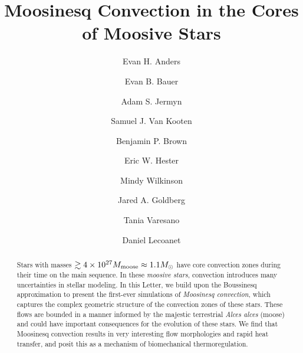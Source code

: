 \documentclass[onecolumn, twocolappendix]{aastex631}
\begin{document}
\title{Moosinesq Convection in the Cores of Moosive Stars}
\author[0000-0002-3433-4733]{Evan H. Anders}
\author[0000-0002-4791-6724]{Evan B. Bauer}
\author[0000-0001-5048-9973]{Adam S. Jermyn}
\author[0000-0002-4472-8517]{Samuel J. Van Kooten}
\author[0000-0001-8935-219X]{Benjamin P. Brown}
\author[0000-0003-1651-9141]{Eric W. Hester}
\author{Mindy Wilkinson}
\author[0000-0003-1012-3031]{Jared A. Goldberg}
\author[0000-0003-0256-9295]{Tania Varesano}
\author[0000-0002-7635-9728]{Daniel Lecoanet}


\begin{abstract}
    Stars with masses $\gtrsim 4 \times 10^{27}M_{\rm{moose}} \approx 1.1 M_\odot$ have core convection zones during their time on the main sequence.
    In these \emph{moosive stars}, convection introduces many uncertainties in stellar modeling.
    In this Letter, we build upon the Boussinesq approximation to present the first-ever simulations of \emph{Moosinesq convection}, which captures the complex geometric structure of the convection zones of these stars.
    These flows are bounded in a manner informed by the majestic terrestrial \emph{Alces alces} (moose) and could have important consequences for the evolution of these stars.
    We find that Moosinesq convection results in very interesting flow morphologies and rapid heat transfer, and posit this as a mechanism of biomechanical thermoregulation.
\end{abstract}
\end{document}
